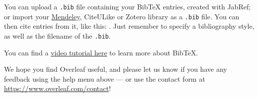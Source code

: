 \documentclass[10pt, a4paper]{article}
\begin{document}
You can upload a \verb|.bib| file containing your BibTeX entries, created with JabRef; or import your \href{https://www.overleaf.com/blog/184}{Mendeley}, CiteULike or Zotero library as a \verb|.bib| file. You can then cite entries from it, like this: \cite{greenwade93}. Just remember to specify a bibliography style, as well as the filename of the \verb|.bib|.

You can find a \href{https://www.overleaf.com/help/97-how-to-include-a-bibliography-using-bibtex}{video tutorial here} to learn more about BibTeX.

We hope you find Overleaf useful, and please let us know if you have any feedback using the help menu above --- or use the contact form at \url{https://www.overleaf.com/contact}!

\newpage

% 

\end{document}
